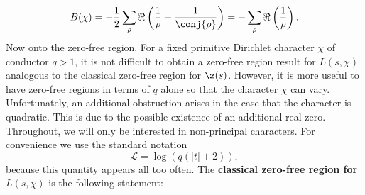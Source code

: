       \begin{equation}\label{equ:B_chi_computation_3}
        B(\chi) = -\frac{1}{2}\sum_{\rho}\Re\left(\frac{1}{\rho}+\frac{1}{\conj{\rho}}\right) = -\sum_{\rho}\Re\left(\frac{1}{\rho}\right).
      \end{equation}
      Now onto the zero-free region. For a fixed primitive Dirichlet character $\chi$ of conductor $q > 1$, it is not difficult to obtain a zero-free region result for $L(s,\chi)$ analogous to the classical zero-free region for $\z(s)$. However, it is more useful to have zero-free regions in terms of $q$ alone so that the character $\chi$ can vary. Unfortunately, an additional obstruction arises in the case that the character is quadratic. This is due to the possible existence of an additional real zero. Throughout, we will only be interested in non-principal characters. For convenience we use the standard notation
      \[
        \mathscr{L} = \log(q(|t|+2)),
      \]
      because this quantity appears all too often. The \textbf{classical zero-free region for $L(s,\chi)$} is the following statement:

